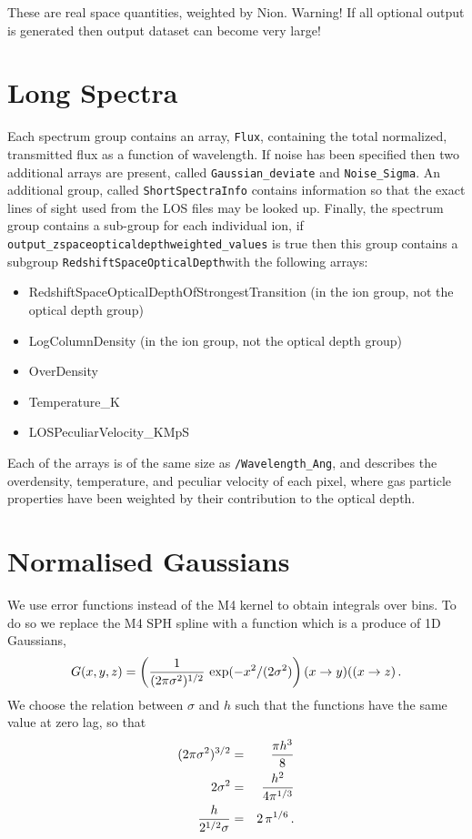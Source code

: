 \documentclass{report}
\begin{document}
These are real space quantities, weighted by Nion.  Warning!  If all optional output is generated then output dataset can become very large!

\section{Long Spectra}

Each spectrum group contains an array, {\tt Flux}, containing the total normalized, transmitted flux as a function of wavelength.  If noise has been specified then two additional arrays are present, called {\tt Gaussian\_deviate} and {\tt Noise\_Sigma}.  An additional group, called {\tt ShortSpectraInfo} contains information so that the exact lines of sight used from the LOS files may be looked up.  Finally, the spectrum group contains a sub-group for each individual ion, if {\tt output\_zspaceopticaldepthweighted\_values} is true then this group contains a subgroup {\tt RedshiftSpaceOpticalDepth}with the following arrays:

\begin{itemize}
\item RedshiftSpaceOpticalDepthOfStrongestTransition (in the ion group, not the optical depth group)
\item LogColumnDensity (in the ion group, not the optical depth group)
\item OverDensity
\item Temperature\_K
\item LOSPeculiarVelocity\_KMpS
\end{itemize}

Each of the arrays is of the same size as {\tt /Wavelength\_Ang}, and describes the overdensity, temperature, and peculiar velocity of each pixel, where gas particle properties have been weighted by their contribution to the optical depth.

\section{Normalised Gaussians}
We use error functions instead of the M4 kernel to obtain integrals over bins. To do so we replace the M4 SPH spline with a function which is a produce of 1D Gaussians,
\begin{equation}
G(x,y,z) = \left({1\over (2\pi \sigma^2)^{1/2}}\,\exp(-x^2/(2\sigma^2)\right)(x\rightarrow y)((x\rightarrow z)\,.
\end{equation}
We choose the relation between $\sigma$ and $h$ such that the functions have the same value at zero lag, so that
\begin{eqnarray}
(2\pi\sigma^2)^{3/2} &=& {\pi h^3\over 8}\nonumber\\
2\sigma^2 &=& {h^2\over 4 \pi^{1/3}}\nonumber\\
{h\over 2^{1/2}\sigma} &=& 2\,\pi^{1/6}\,.
\end{eqnarray}
\end{document}
